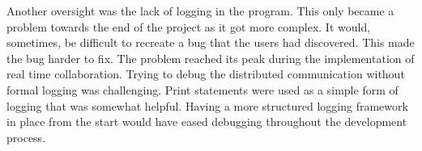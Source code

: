 Another oversight was the lack of logging in the program.  This only became a problem towards the end of the project as it got more complex.  It would, sometimes, be difficult to recreate a bug that the users had discovered.  This made the bug harder to fix.  The problem reached its peak during the implementation of real time collaboration.  Trying to debug the distributed communication without formal logging was challenging.  Print statements were used as a simple form of logging that was somewhat helpful.  Having a more structured logging framework in place from the start would have eased debugging throughout the development process.



